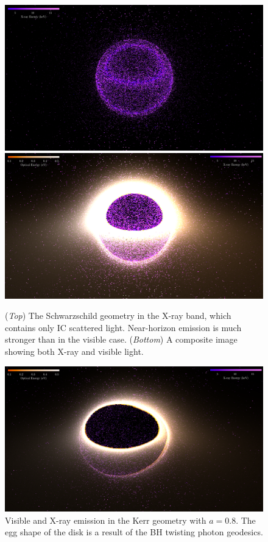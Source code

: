 \documentclass[twocolumn,twocolappendix]{aastex631}
\begin{document}
\begin{figure}[htbp!]
  \centering
  \includegraphics[width=\linewidth]{../data/schwarzschild-bright-xray.pdf}
  \includegraphics[width=\linewidth]{../data/schwarzschild-tog.pdf}
  \caption{(\textit{Top}) The Schwarzschild geometry in the X-ray band, which contains only IC scattered light. Near-horizon emission is much stronger than in the visible case. (\textit{Bottom}) A composite image showing both X-ray and visible light.}
  \label{fig:sch}
\end{figure}


\begin{figure}
  \centering
  \includegraphics[width=\linewidth]{../data/kerr-tog.pdf}
  \caption{Visible and X-ray emission in the Kerr geometry with $a = 0.8$. The egg shape of the disk is a result of the BH twisting photon geodesics.}
  \label{fig:kerr}
\end{figure}
\end{document}
